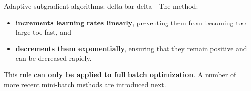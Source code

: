 \begin{frame}[t,allowframebreaks]{
    Adaptive subgradient algorithms: delta-bar-delta -}
    The method:
    \begin{itemize} 
        \item {\bf increments \glspl{learning rate} linearly}, 
        preventing them from becoming too large too fast, and
        \item {\bf decrements them exponentially},
        ensuring that they remain positive and can be decreased rapidly.\\
    \end{itemize}
    \vspace{0.2cm}

    This rule {\bf can only be applied to full batch optimization}.
    A number of more recent mini-batch methods are introduced next.\\

\end{frame}